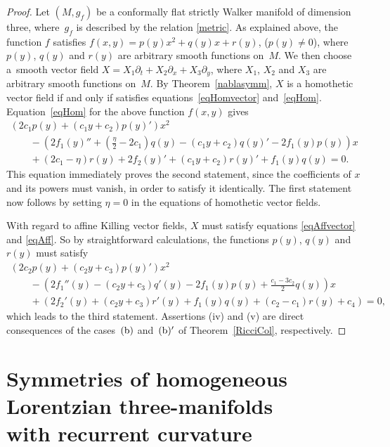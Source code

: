 \documentclass[pdftex]{sigma}
\numberwithin{equation}{section}
\begin{document}
\begin{proof}
Let $(M,g_f)$ be a conformally f\/lat strictly Walker manifold of dimension three, where~$g_f$ is described by the relation \eqref{metric}. As explained above, the function $f$ satisf\/ies $f(x,y)=p(y)x^2+q(y)x+r(y)$, ($p(y)\neq 0$), where $p(y)$, $q(y)$ and $r(y)$ are arbitrary smooth functions on~$M$. We then choose a~smooth vector f\/ield $X=X_1\partial_t+X_2\partial_x+X_3\partial_y$, where $X_1$, $X_2$ and $X_3$ are arbitrary smooth functions on~$M$. By Theorem~\ref{nablasymm}, $X$ is a homothetic vector f\/ield if and only if satisf\/ies equations~\eqref{eqHomvector} and~\eqref{eqHom}. Equation~\eqref{eqHom} for the above function $f(x,y)$ gives
\begin{gather*}
\left(2c_1p(y)+(c_1y+c_2)p(y)'\right)x^2 \\
\qquad {} -\left(2f_1(y)''+\left(\frac{\eta}{2}-2c_1\right)q(y)-(c_1y+c_2)q(y)'-2f_1(y)p(y)\right)x\\
\qquad{} +(2c_1-\eta)r(y)+2f_2(y)'+(c_1y+c_2)r(y)'+f_1(y)q(y)=0.
\end{gather*}
This equation immediately proves the second statement, since the coef\/f\/icients of $x$ and {its powers must vanish, in order to satisfy it identically. The f\/irst statement now follows by} {setting} $\eta=0$ in the equations of homothetic vector f\/ields.

With regard to af\/f\/ine Killing vector f\/ields, $X$ must satisfy equations \eqref{eqAffvector} and \eqref{eqAff}. So by straightforward calculations, the functions $p(y)$, $q(y)$ and $r(y)$ must satisfy
\begin{gather*}
\left(2c_2p(y)+(c_2y+c_3)p(y)'\right)x^2\\
\qquad{}-\left(2f_1 ''(y)-(c_2y+c_3)q'(y)-2f_1(y)p(y)+\frac{c_1-3c_2}{2}q(y)\right)x\\
\qquad{}+\left(2f_2 '(y)+(c_2y+c_3)r'(y)+f_1(y)q(y)+(c_2-c_1)r(y)+c_4\right)=0,
\end{gather*}
which {leads to} the third statement. Assertions (iv) and (v) are direct consequences of the cases~${\rm (b)}$ and~${\rm (b)'}$ of Theorem~\ref{RicciCol}, respectively.
\end{proof}

\section[Symmetries of homogeneous Lorentzian three-manifolds with recurrent curvature]{Symmetries of homogeneous Lorentzian three-manifolds \\ with recurrent curvature}\label{section4}
\end{document}
